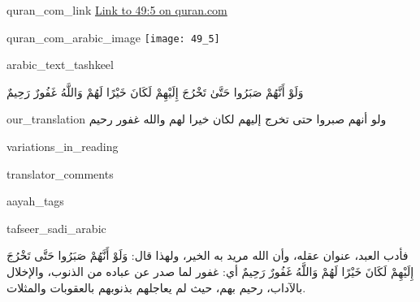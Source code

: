 \begin{comment}
The following strings are to be replaced by a script, in order to use this file as a template (all upper case):-
* sN = sūrah number, without leading zeros
* aYN = āyah number, without leading zeros
* aRABIC_TEXT_TASHKEEL = the text of the aayah, with tashkeel marks
* aRABIC_TEXT_WITHOUT_TASHKEEL = the text of the aayah, without tashkeel marks
* tAFSEER_SADI_ARABIC = the tafseer of the aayah from as-sa'di
\end{comment}
\begin{comment}
The following tags are declared here:-
quran_com_link
quran_com_arabic_image
arabic_text_tashkeel
our_translation
variations_in_reading
translator_comments
aayah_tags
tafseer_sadi_arabic
tafseer_sadi_translation
\end{comment}
\begin{taggedblock}{quran_com_link}
\href{http://quran.com/49/5}{Link to 49:5 on quran.com}
\end{taggedblock}
\begin{taggedblock}{quran_com_arabic_image}
\texttt{[image: 49\_5]}
\end{taggedblock}
\begin{taggedblock}{arabic_text_tashkeel}
\begin{Arabic}
وَلَوْ أَنَّهُمْ صَبَرُوا حَتَّىٰ تَخْرُجَ إِلَيْهِمْ لَكَانَ خَيْرًا لَهُمْ وَاللَّهُ غَفُورٌ رَحِيمٌ
\end{Arabic}
\end{taggedblock}
\begin{taggedblock}{our_translation}
ولو أنهم صبروا حتى تخرج إليهم لكان خيرا لهم والله غفور رحيم
\end{taggedblock}
\begin{taggedblock}{variations_in_reading}
\end{taggedblock}
\begin{taggedblock}{translator_comments}
\end{taggedblock}
\begin{taggedblock}{aayah_tags}
\end{taggedblock}
\begin{taggedblock}{tafseer_sadi_arabic}
\begin{Arabic}
فأدب العبد، عنوان عقله، وأن الله مريد به الخير، ولهذا قال:
{ وَلَوْ أَنَّهُمْ صَبَرُوا حَتَّى تَخْرُجَ إِلَيْهِمْ لَكَانَ خَيْرًا لَهُمْ وَاللَّهُ غَفُورٌ رَحِيمٌ }
أي: غفور لما صدر عن عباده من الذنوب، والإخلال بالآداب، رحيم بهم، حيث لم يعاجلهم بذنوبهم بالعقوبات والمثلات.
\end{Arabic}
\end{taggedblock}
